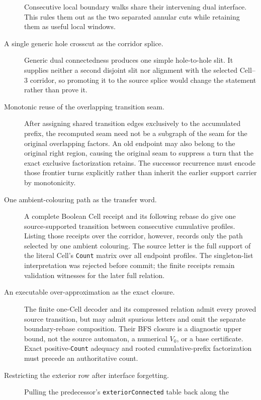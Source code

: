 \documentclass[11pt]{article}
\theoremstyle{definition}
\begin{document}
\begin{description}
        Consecutive local boundary walks share their intervening dual
        interface.  This rules them out as the two separated annular cuts while
        retaining them as useful local windows.
  \item[A single generic hole crosscut as the corridor splice.] Generic dual
        connectedness produces one simple hole-to-hole slit.  It supplies
        neither a second disjoint slit nor alignment with the selected Cell--3
        corridor, so promoting it to the source splice would change the
        statement rather than prove it.
  \item[Monotonic reuse of the overlapping transition seam.] After assigning
        shared transition edges exclusively to the accumulated prefix, the
        recomputed seam need not be a subgraph of the seam for the original
        overlapping factors.  An old endpoint may also belong to the original
        right region, causing the original seam to suppress a turn that the
        exact exclusive factorization retains.  The successor recurrence must
        encode those frontier turns explicitly rather than inherit the earlier
        support carrier by monotonicity.
  \item[One ambient-colouring path as the transfer word.] A complete Boolean
        Cell receipt and its following rebase do give one source-supported
        transition between consecutive cumulative profiles.  Listing those
        receipts over the corridor, however, records only the path selected by
        one ambient colouring.  The source letter is the full support of the
        literal Cell's \texttt{Count} matrix over all endpoint profiles.  The
        singleton-list interpretation was rejected before commit; the finite
        receipts remain validation witnesses for the later full relation.
  \item[An executable over-approximation as the exact closure.] The finite
        one-Cell decoder and its compressed relation admit every proved source
        transition, but may admit spurious letters and omit the separate
        boundary-rebase composition.  Their BFS closure is a diagnostic upper
        bound, not the source automaton, a numerical $V_0$, or a base
        certificate.  Exact positive-\texttt{Count} adequacy and rooted
        cumulative-prefix factorization must precede an authoritative count.
  \item[Restricting the exterior row after interface forgetting.] Pulling the
        predecessor's \texttt{exteriorConnected} table back along the

\end{description}
\end{document}
